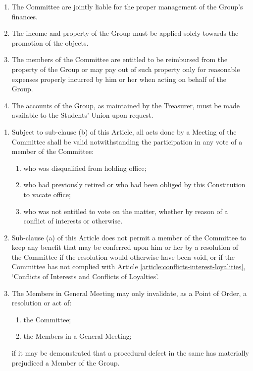 \documentclass[12pt]{constitution}
\begin{document}
\label{article:financial-management}

\begin{enumerate}
    \item The Committee are jointly liable for the proper management of the Group's finances.
    \item The income and property of the Group must be applied solely towards the promotion of the objects.
    \item The members of the Committee are entitled to be reimbursed from the property of the Group or may pay out of such property only for reasonable expenses properly incurred by him or her when acting on behalf of the Group.
    \item The accounts of the Group, as maintained by the Treasurer, must be made available to the Students' Union upon request.
\end{enumerate}


\label{article:irregularities-saving-provisions}

\begin{enumerate}
    \item Subject to sub-clause (b) of this Article, all acts done by a Meeting of the Committee shall be valid notwithstanding the participation in any vote of a member of the Committee:
    \begin{enumerate}
        \item who was disqualified from holding office;
        \item who had previously retired or who had been obliged by this Constitution to vacate office;
        \item who was not entitled to vote on the matter, whether by reason of a conflict of interests or otherwise.
    \end{enumerate}

    \item Sub-clause (a) of this Article does not permit a member of the Committee to keep any benefit that may be conferred upon him or her by a resolution of the Committee if the resolution would otherwise have been void, or if the Committee has not complied with Article \ref{article:conflicts-interest-loyalities}, `Conflicts of Interests and Conflicts of Loyalties'.
    \item The Members in General Meeting may only invalidate, as a Point of Order, a resolution or act of:
    \begin{enumerate}
        \item the Committee;
        \item the Members in a General Meeting;
    \end{enumerate}
    if it may be demonstrated that a procedural defect in the same has materially prejudiced a Member of the Group.
\end{enumerate}
\end{document}
